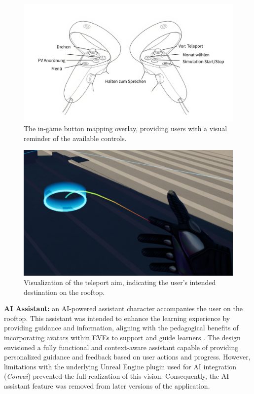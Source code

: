 \documentclass[draft, final]{vutinfth} %
\begin{document}
\begin{figure}
    \centering
    \includegraphics[width=\textwidth]{graphics/button-map.jpg}
    \caption{The in-game button mapping overlay, providing users with a visual reminder of the available controls.}
    \label{fig:button-mapping}
\end{figure}

\begin{figure}
    \centering
    \includegraphics[width=\textwidth]{graphics/teleport.jpg}
    \caption{Visualization of the teleport aim, indicating the user's intended destination on the rooftop.}
    \label{fig:teleport-visualization}
\end{figure}

\textbf{AI Assistant:} an AI-powered assistant character accompanies the user on the rooftop. This assistant was intended to enhance the learning experience by providing guidance and information, aligning with the pedagogical benefits of incorporating avatars within EVEs to support and guide learners \cite{Mikropoulos2011VrEducational}. The design envisioned a fully functional and context-aware assistant capable of providing personalized guidance and feedback based on user actions and progress. However, limitations with the underlying Unreal Engine plugin used for AI integration (\textit{Convai}) prevented the full realization of this vision. Consequently, the AI assistant feature was removed from later versions of the application.
\end{document}
